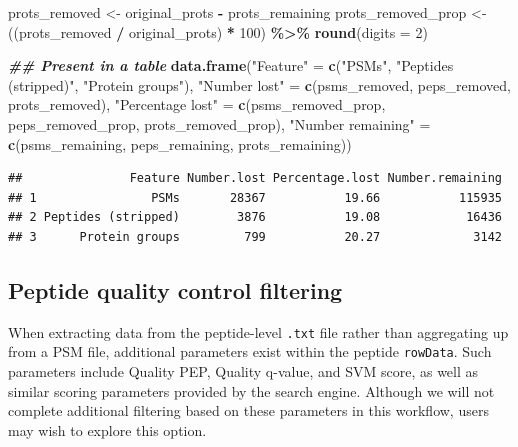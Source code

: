 \documentclass[9pt,a4paper,]{extarticle}
\newenvironment{Shaded}{\begin{snugshade}}{\end{snugshade}}
\newcommand{\AttributeTok}[1]{\textcolor[rgb]{0.13,0.29,0.53}{#1}}
\newcommand{\DecValTok}[1]{\textcolor[rgb]{0.00,0.00,0.81}{#1}}
\newcommand{\DocumentationTok}[1]{\textcolor[rgb]{0.56,0.35,0.01}{\textbf{\textit{#1}}}}
\newcommand{\FunctionTok}[1]{\textcolor[rgb]{0.13,0.29,0.53}{\textbf{#1}}}
\newcommand{\NormalTok}[1]{#1}
\newcommand{\OtherTok}[1]{\textcolor[rgb]{0.56,0.35,0.01}{#1}}
\newcommand{\SpecialCharTok}[1]{\textcolor[rgb]{0.81,0.36,0.00}{\textbf{#1}}}
\newcommand{\StringTok}[1]{\textcolor[rgb]{0.31,0.60,0.02}{#1}}
\begin{document}
\begin{Shaded}
\begin{Highlighting}[]
\NormalTok{prots\_removed }\OtherTok{\textless{}{-}}\NormalTok{ original\_prots }\SpecialCharTok{{-}}\NormalTok{ prots\_remaining}
\NormalTok{prots\_removed\_prop }\OtherTok{\textless{}{-}}\NormalTok{ ((prots\_removed }\SpecialCharTok{/}\NormalTok{ original\_prots) }\SpecialCharTok{*} \DecValTok{100}\NormalTok{) }\SpecialCharTok{\%\textgreater{}\%}
  \FunctionTok{round}\NormalTok{(}\AttributeTok{digits =} \DecValTok{2}\NormalTok{)}

\DocumentationTok{\#\# Present in a table}
\FunctionTok{data.frame}\NormalTok{(}\StringTok{"Feature"} \OtherTok{=} \FunctionTok{c}\NormalTok{(}\StringTok{"PSMs"}\NormalTok{,}
                         \StringTok{"Peptides (stripped)"}\NormalTok{,}
                         \StringTok{"Protein groups"}\NormalTok{),}
           \StringTok{"Number lost"} \OtherTok{=} \FunctionTok{c}\NormalTok{(psms\_removed,}
\NormalTok{                             peps\_removed,}
\NormalTok{                             prots\_removed),}
           \StringTok{"Percentage lost"} \OtherTok{=} \FunctionTok{c}\NormalTok{(psms\_removed\_prop,}
\NormalTok{                                 peps\_removed\_prop,}
\NormalTok{                                 prots\_removed\_prop),}
           \StringTok{"Number remaining"} \OtherTok{=} \FunctionTok{c}\NormalTok{(psms\_remaining,}
\NormalTok{                                  peps\_remaining,}
\NormalTok{                                  prots\_remaining))}
\end{Highlighting}
\end{Shaded}

\begin{verbatim}
##               Feature Number.lost Percentage.lost Number.remaining
## 1                PSMs       28367           19.66           115935
## 2 Peptides (stripped)        3876           19.08            16436
## 3      Protein groups         799           20.27             3142
\end{verbatim}

\subsection{Peptide quality control filtering}\label{peptide-quality-control-filtering}

When extracting data from the peptide-level \texttt{.txt} file rather than aggregating
up from a PSM file, additional parameters exist within the peptide \texttt{rowData}.
Such parameters include Quality PEP, Quality q-value, and SVM score, as well as
similar scoring parameters provided by the search engine. Although we will not
complete additional filtering based on these parameters in this workflow, users
may wish to explore this option.
\end{document}
